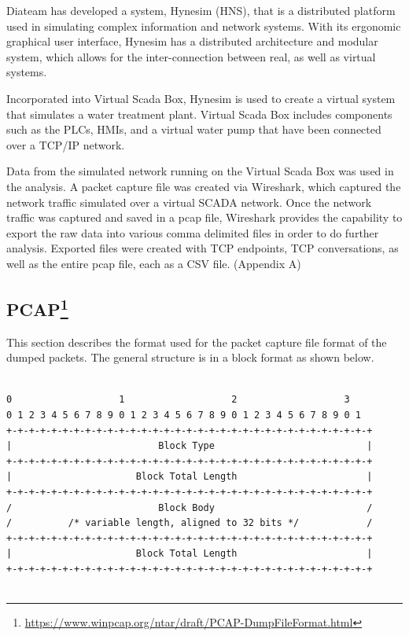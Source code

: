 \documentclass[12pt,]{article}
\let\rmarkdownfootnote\footnote%
\def\footnote{\protect\rmarkdownfootnote}
\begin{document}
Diateam has developed a system, Hynesim (HNS), that is a distributed
platform used in simulating complex information and network systems.
With its ergonomic graphical user interface, Hynesim has a distributed
architecture and modular system, which allows for the inter-connection
between real, as well as virtual systems.

Incorporated into Virtual Scada Box, Hynesim is used to create a virtual
system that simulates a water treatment plant. Virtual Scada Box
includes components such as the PLCs, HMIs, and a virtual water pump
that have been connected over a TCP/IP network.

Data from the simulated network running on the Virtual Scada Box was
used in the analysis. A packet capture file was created via Wireshark,
which captured the network traffic simulated over a virtual SCADA
network. Once the network traffic was captured and saved in a pcap file,
Wireshark provides the capability to export the raw data into various
comma delimited files in order to do further analysis. Exported files
were created with TCP endpoints, TCP conversations, as well as the
entire pcap file, each as a CSV file. (Appendix A)

\subsection[PCAP]{PCAP\footnote{\url{https://www.winpcap.org/ntar/draft/PCAP-DumpFileFormat.html}}}\label{pcap5}

This section describes the format used for the packet capture file
format of the dumped packets. The general structure is in a block format
as shown below.

\pagebreak

\begin{verbatim}

0                   1                   2                   3
0 1 2 3 4 5 6 7 8 9 0 1 2 3 4 5 6 7 8 9 0 1 2 3 4 5 6 7 8 9 0 1
+-+-+-+-+-+-+-+-+-+-+-+-+-+-+-+-+-+-+-+-+-+-+-+-+-+-+-+-+-+-+-+-+
|                          Block Type                           |
+-+-+-+-+-+-+-+-+-+-+-+-+-+-+-+-+-+-+-+-+-+-+-+-+-+-+-+-+-+-+-+-+
|                      Block Total Length                       |
+-+-+-+-+-+-+-+-+-+-+-+-+-+-+-+-+-+-+-+-+-+-+-+-+-+-+-+-+-+-+-+-+
/                          Block Body                           /
/          /* variable length, aligned to 32 bits */            /
+-+-+-+-+-+-+-+-+-+-+-+-+-+-+-+-+-+-+-+-+-+-+-+-+-+-+-+-+-+-+-+-+
|                      Block Total Length                       |
+-+-+-+-+-+-+-+-+-+-+-+-+-+-+-+-+-+-+-+-+-+-+-+-+-+-+-+-+-+-+-+-+    
    
\end{verbatim}
\end{document}
